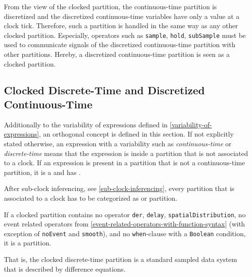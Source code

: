 From the view of the clocked partition, the continuous-time
partition is discretized and the discretized continuous-time variables
have only a value at a clock tick. Therefore, such a partition is
handled in the same way as any other clocked partition. Especially,
operators such as \lstinline!sample!, \lstinline!hold!, \lstinline!subSample! must be used to communicate
signals of the discretized continuous-time partition with other
partitions. Hereby, a discretized continuous-time partition is seen as a
clocked partition.


\subsection{Clocked Discrete-Time and Discretized Continuous-Time}\label{clocked-discrete-time-and-clocked-discretized-continuous-time-partition}

Additionally to the variability of expressions defined in \cref{variability-of-expressions}, an orthogonal concept  is defined in this section.
If not explicitly stated otherwise, an expression with a variability such as \emph{continuous-time} or \emph{discrete-time} means that the expression is inside a partition that is not associated to a clock.
If an expression is present in a partition that is not a continuous-time partition, it is a  and has .

After sub-clock inferencing, see \cref{sub-clock-inferencing}, every partition that is associated to a clock has to be categorized as  or  partition.

If a clocked partition contains no operator \lstinline!der!, \lstinline!delay!, \lstinline!spatialDistribution!, no event related operators from \cref{event-related-operators-with-function-syntax} (with exception of \lstinline!noEvent! and \lstinline!smooth!), and no \lstinline!when!-clause with a \lstinline!Boolean! condition, it is a  partition.

\begin{nonnormative}
That is, the clocked discrete-time partition is a standard sampled data system that is described by difference equations.
\end{nonnormative}

